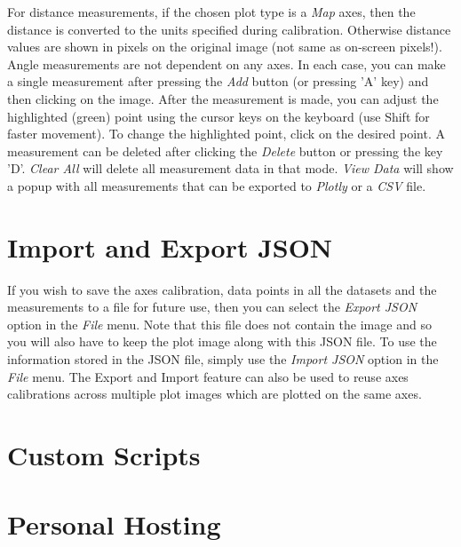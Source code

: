 \documentclass[letterpaper, 10pt]{article}
\begin{document}
For distance measurements, if the chosen plot type is a \emph{Map} axes, then the distance is converted to the units specified during calibration. Otherwise distance values are shown in pixels on the original image (not same as on-screen pixels!). Angle measurements are not dependent on any axes. In each case, you can make a single measurement after pressing the \emph{Add} button (or pressing 'A' key) and then clicking on the image. After the measurement is made, you can adjust the highlighted (green) point using the cursor keys on the keyboard (use Shift for faster movement). To change the highlighted point, click on the desired point. A measurement can be deleted after clicking the \emph{Delete} button or pressing the key 'D'. \emph{Clear All} will delete all measurement data in that mode. \emph{View Data} will show a popup with all measurements that can be exported to \emph{Plotly} or a \emph{CSV} file.

\section{Import and Export JSON}
\label{sec:jsonImportExport}
If you wish to save the axes calibration, data points in all the datasets and the measurements to a file for future use, then you can select the \emph{Export JSON} option in the \emph{File} menu. Note that this file does not contain the image and so you will also have to keep the plot image along with this JSON file. To use the information stored in the JSON file, simply use the \emph{Import JSON} option in the \emph{File} menu. The Export and Import feature can also be used to reuse axes calibrations across multiple plot images which are plotted on the same axes.

\section{Custom Scripts}

\section{Personal Hosting}
\end{document}
